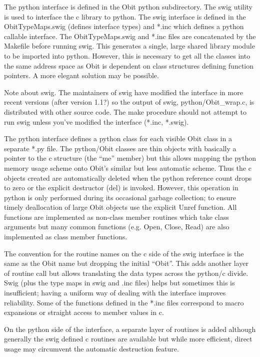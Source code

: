 \documentclass[11pt]{report}
\begin{document}
The python interface is defined in the Obit python subdirectory.
The swig utility is used to interface the c library to python.
The swig interface is defined in the ObitTypeMaps.swig (defines
interface types) and *.inc which defines a python callable interface.
The ObitTypeMaps.swig and *.inc files are concatenated by the Makefile
before running swig.
This generates a single, large shared library module to be imported
into python.
However, this is necessary to get all the classes into the same
address space as Obit is dependent on class structures defining
function pointers.
A more elegant solution may be possible.

Note about swig.  The maintainers of swig have modified the interface 
in more recent versions (after version 1.1?) so the output of swig, 
python/Obit\_wrap.c, is distributed with other source code.  
The make procedure should not attempt to run swig unless you've modified
the interface (*.inc, *.swig).

The python interface defines a python class for each visible Obit
class in a separate *.py file.
The python/Obit classes are thin objects with basically a pointer to
the c structure (the ``me'' member) but this allows mapping the python
memory usage scheme onto Obit's similar but less automatic scheme. 
Thus the c objects created are automatically deleted when the python
reference count drops to zero or the explicit destructor (del) is
invoked.
However, this operation in python is only performed during its
occasional garbage collection; to ensure timely deallocation of large
Obit objects use the explicit Unref function.
All functions are implemented as non-class member routines which take
class arguments but many common functions (e.g. Open, Close, Read) are
also implemented as class member functions.

The convention for the routine names on the c side of the swig
interface is the same as the Obit name but dropping the initial
``Obit''.
This adds another layer of routine call but allows translating the
data types across the python/c divide.
Swig (plus the type maps in swig and .inc files) helps but sometimes 
this is insufficient; having a uniform way of dealing with the
interface improves reliability.
Some of the functions defined in the *.inc files correspond to macro
expansions or straight access to member values in c.

On the python side of the interface, a separate layer of routines
is added although generally the swig defined c routines are available
but while more efficient, direct usage may circumvent the automatic
destruction feature.
\end{document}
